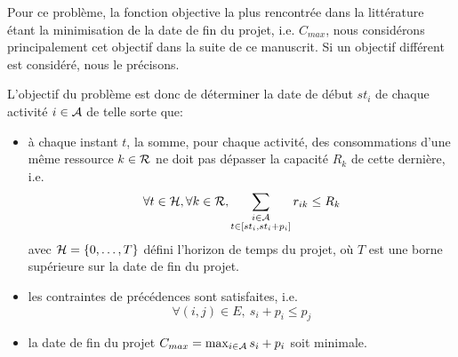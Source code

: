 Pour ce problème, la fonction objective la
plus rencontrée dans la littérature étant la minimisation de la date
de fin du projet, i.e. $C_{max}$, nous considérons principalement cet
objectif dans la suite de ce manuscrit. Si un objectif différent est
considéré, nous le précisons. 

L'objectif du problème est donc de déterminer la date de début $st_i$
de chaque activité $i\in {\cal A}$ de telle sorte que:
\begin{itemize}
\item à chaque instant $t$, la somme, pour chaque activité, des
  consommations d'une même ressource $k \in {\cal R}$ ne doit pas dépasser la
  capacité $R_{k}$ de cette dernière, i.e.
  \begin{equation}\forall t \in {\cal H}, \forall k \in {\cal R},\sum_{\substack{i\in {\cal A}\\ t \in
        [st_i,st_i+p_i]}} r_{ik} \le R_k\end{equation} 
  avec ${\cal H}=\{0,\dots,T\}$ défini l'horizon de temps du projet, où $T$
  est une borne supérieure sur la date de fin du projet.
\item les contraintes de précédences sont satisfaites, i.e. 
  \begin{equation} \forall (i,j) \in E,\ s_i+p_i \le p_j \end{equation}
\item la date de fin du projet $C_{max}= \max_{i \in {\cal A}} s_i+p_i$
  soit minimale. 
\end{itemize}


